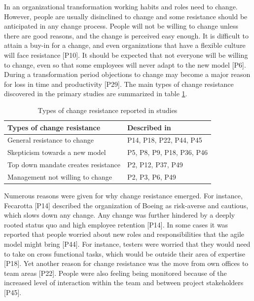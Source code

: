 In an organizational transformation working habits and roles need to change.
However, people are usually disinclined to change and some resistance should be
anticipated in any change process. People will not be willing to change unless
there are good reasons, and the change is perceived easy enough. It is difficult
to attain a buy-in for a change, and even organizations that have a flexible
culture will face resistance [P10]. It should be expected that not everyone will
be willing to change, even so that some employees will never adapt to the new
model [P6]. During a transformation period objections to change may become a
major reason for loss in time and productivity [P29]. The main types of change
resistance discovered in the primary studies are summarized in table
\ref{table:challenges_changeresistance}.

\begin{table}[b]
    \centering
    \begin{tabular}{ l l }
        \toprule
        Types of change resistance           &  Described in  \\
        \midrule
        General resistance to change         &  P14, P18, P22, P44, P45   \\
        Skepticism towards a new model       &  P5, P8, P9, P18, P36, P46 \\
        Top down mandate creates resistance  &  P2, P12, P37, P49 \\
        Management not willing to change     &  P2, P3, P6, P49 \\
        \bottomrule
    \end{tabular}
    \caption{Types of change resistance reported in studies}
    \label{table:challenges_changeresistance}
\end{table}

Numerous reasons were given for why change resistance emerged. For
instance, Fecarotta [P14] described the organization of Boeing as risk-averse
and cautious, which slows down any change. Any change was further hindered by a
deeply rooted status quo and high employee retention [P14]. In some cases it was
reported that people worried about new roles and responsibilities that the agile
model might bring [P44]. For instance, testers were worried that they would need
to take on cross functional tasks, which would be outside their area of
expertise [P18]. Yet another reason for change resistance was the move from own
offices to team areas [P22]. People were also feeling being monitored because of
the increased level of interaction within the team and between project
stakeholders [P45].

